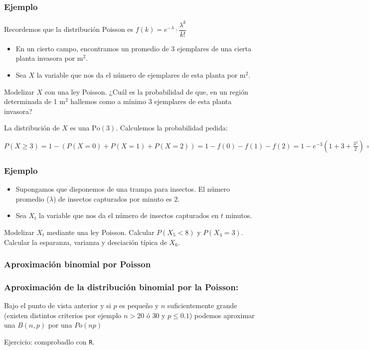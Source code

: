\begin{frame}
\frametitle{Ejemplo}
Recordemos que la distribución Poisson es $f(k)=e^{-\lambda}\cdot \dfrac{\lambda^k}{k!}$
\begin{itemize}
\item En un cierto campo, encontramos un promedio de $3$ ejemplares de una cierta planta invasora por  m${}^2$.
\item Sea $X$ la variable que nos da el número de ejemplares de esta planta por  m${}^2$.
\end{itemize}

Modelizar $X$ con una ley Poisson. ¿Cuál es la probabilidad de que, en un región determinada de 1 m${}^2$ hallemos  como a mínimo $3$ ejemplares de esta planta invasora?

La distribución de $X$ es una  $\mbox{Po}(3)$. Calculemos la probabilidad pedida:
\medskip

$P(X\geq 3)=1-(P(X=0)+P(X=1)+P(X=2))=1-f(0)-f(1)-f(2)=
1-e^{-3}(1+3+\frac{3^2}{2})=\ldots$

\end{frame}


\begin{frame}
\frametitle{Ejemplo}
\begin{itemize}
\item Supongamos que disponemos de una trampa para insectos. El número promedio ($\lambda$) de insectos capturados por minuto es $2$.
\item Sea $X_t$ la variable que nos da el número de insectos capturados en $t$ minutos.
\end{itemize}

Modelizar $X_t$ mediante una ley Poisson. Calcular $P(X_{5}<8)$ y $P(X_4=3)$. Calcular la esparanza, varianza y desciación típica de $X_6$.
\end{frame}

\subsubsection{Aproximación binomial por Poisson}

\begin{frame}
    \frametitle{Aproximación de la distribución binomial por la Poisson:}
    Bajo el punto de vista anterior y si $p$ es pequeño y $n$
    suficientemente grande (existen distintos criterios por ejemplo $n>20$ \'o $30$ y  $p\leq 0.1$)
    podemos aproximar una $B(n,p)$ por una $Po(n p)$

Ejercicio: comprobadlo con \texttt{R}.
\end{frame}

